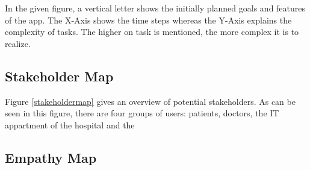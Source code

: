 

In the given figure, a vertical letter shows the initially planned goals and features of the app. The X-Axis shows the time steps whereas the Y-Axis explains the complexity of tasks. The higher on task is mentioned, the more complex it is to realize.

%

\subsection{Stakeholder Map}

Figure \ref{stakeholdermap} gives an overview of potential stakeholders. As can be seen in this figure, there are four groups of users: patients, doctors, the IT appartment of the hospital and the 


\subsection{Empathy Map}

%
%


